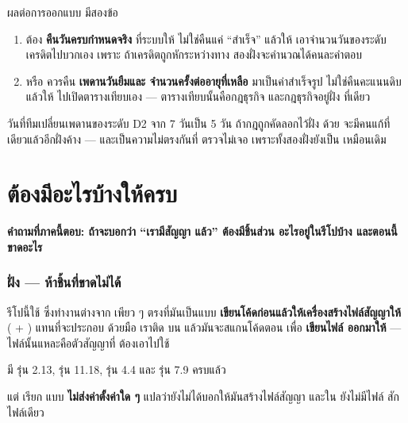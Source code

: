ผลต่อการออกแบบ  มีสองข้อ

\begin{enumerate}
\item {} ต้อง \textbf{คืนวันครบกำหนดจริง} ที่ระบบให้ ไม่ใช่คืนแค่
      ``สำเร็จ'' แล้วให้  เอาจำนวนวันของระดับเครดิตไปบวกเอง เพราะ
      ถ้าเครดิตถูกหักระหว่างทาง สองฝั่งจะคำนวณได้คนละคำตอบ
\item {} หรือ  ควรคืน \textbf{เพดานวันยืมและ
      จำนวนครั้งต่ออายุที่เหลือ} มาเป็นค่าสำเร็จรูป ไม่ใช่คืนคะแนนดิบแล้วให้
       ไปเปิดตารางเทียบเอง --- ตารางเทียบนั้นคือกฎธุรกิจ
      และกฎธุรกิจอยู่ฝั่ง  ที่เดียว
\end{enumerate}

\begin{warnbox}[title={ถ้า \en{frontend} คำนวณเองเมื่อไร กฎจะมีสองชุดทันที}]
วันที่ทีมเปลี่ยนเพดานของระดับ D2 จาก 7 วันเป็น 5 วัน ถ้ากฎถูกคัดลอกไว้ฝั่ง
 ด้วย จะมีคนแก้ที่เดียวแล้วอีกฝั่งค้าง --- และเป็นความไม่ตรงกันที่
 ตรวจไม่เจอ เพราะทั้งสองฝั่งยังเป็น  เหมือนเดิม
\end{warnbox}

\clearpage

\part{ต้องมีอะไรบ้างให้ครบ}

\textbf{คำถามที่ภาคนี้ตอบ: ถ้าจะบอกว่า ``เรามีสัญญา  แล้ว'' ต้องมีชิ้นส่วน
อะไรอยู่ในรีโปบ้าง และตอนนี้ขาดอะไร}

\section{ฝั่ง  --- ห้าชิ้นที่ขาดไม่ได้}

รีโปนี้ใช้  ซึ่งทำงานต่างจาก  เพียว ๆ ตรงที่มันเป็นแบบ
\textbf{เขียนโค้ดก่อนแล้วให้เครื่องสร้างไฟล์สัญญาให้} ( +
) แทนที่จะประกอบ  ด้วยมือ เราติด  บน
 แล้วมันจะสแกนโค้ดตอน  เพื่อ \textbf{เขียนไฟล์ 
ออกมาให้} --- ไฟล์นั้นแหละคือตัวสัญญาที่  ต้องเอาไปใช้

\begin{goodbox}[title={ตรวจสอบกับรีโปแล้ว: ของที่ลงไว้ครบ แต่ยังไม่ได้เปิดใช้}]
 มี  รุ่น 2.13,
 รุ่น 11.18,  รุ่น 4.4 และ 
รุ่น 7.9 ครบแล้ว

แต่  เรียก  แบบ
\textbf{ไม่ส่งค่าตั้งค่าใด ๆ} แปลว่ายังไม่ได้บอกให้มันสร้างไฟล์สัญญา และใน
 ยังไม่มีไฟล์  สักไฟล์เดียว
\end{goodbox}

